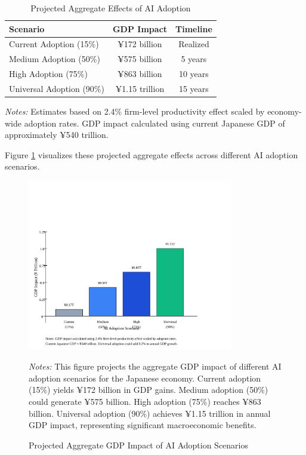 \documentclass[12pt]{article}
\begin{document}
\begin{table}[H]
\centering
\caption{Projected Aggregate Effects of AI Adoption}
\label{tab:aggregate}
\begin{tabular}{lcc}
\toprule
Scenario & GDP Impact & Timeline \\
\midrule
Current Adoption (15\%) & ¥172 billion & Realized \\
Medium Adoption (50\%) & ¥575 billion & 5 years \\
High Adoption (75\%) & ¥863 billion & 10 years \\
Universal Adoption (90\%) & ¥1.15 trillion & 15 years \\
\bottomrule
\end{tabular}
\begin{minipage}{\textwidth}
\footnotesize
\textit{Notes:} Estimates based on 2.4\% firm-level productivity effect scaled by economy-wide adoption rates. GDP impact calculated using current Japanese GDP of approximately ¥540 trillion.
\end{minipage}
\end{table}

Figure \ref{fig:aggregate_impact} visualizes these projected aggregate effects across different AI adoption scenarios.

\begin{figure}[H]
\centering
\includegraphics[width=0.8\textwidth]{figures/figure5_aggregate_impact.svg}
\caption{Projected Aggregate GDP Impact of AI Adoption Scenarios}
\label{fig:aggregate_impact}
\begin{minipage}{\textwidth}
\footnotesize
\textit{Notes:} This figure projects the aggregate GDP impact of different AI adoption scenarios for the Japanese economy. Current adoption (15\%) yields ¥172 billion in GDP gains. Medium adoption (50\%) could generate ¥575 billion. High adoption (75\%) reaches ¥863 billion. Universal adoption (90\%) achieves ¥1.15 trillion in annual GDP impact, representing significant macroeconomic benefits.
\end{minipage}
\end{figure}
\end{document}
